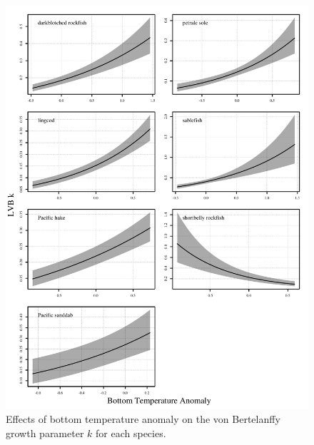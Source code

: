 \documentclass[]{article}
\begin{document}
\begin{figure}
\caption{Effects of bottom temperature anomaly on the von Bertelanffy growth parameter $k$ for each species.}\label{temp_effect_k}
\begin{center}
\includegraphics[height = 0.8\textheight]{../results/ss_lvb_temp/temp_effect_by_species.pdf}
\end{center}
\end{figure}
\end{document}
